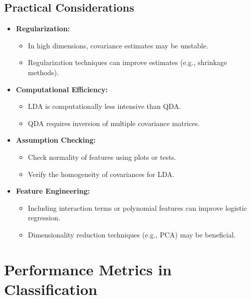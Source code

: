 \documentclass{article}
\begin{document}
\subsection{Practical Considerations}

\begin{itemize}
    \item \textbf{Regularization:}
    \begin{itemize}
        \item In high dimensions, covariance estimates may be unstable.
        \item Regularization techniques can improve estimates (e.g., shrinkage methods).
    \end{itemize}
    \item \textbf{Computational Efficiency:}
    \begin{itemize}
        \item LDA is computationally less intensive than QDA.
        \item QDA requires inversion of multiple covariance matrices.
    \end{itemize}
    \item \textbf{Assumption Checking:}
    \begin{itemize}
        \item Check normality of features using plots or tests.
        \item Verify the homogeneity of covariances for LDA.
    \end{itemize}
    \item \textbf{Feature Engineering:}
    \begin{itemize}
        \item Including interaction terms or polynomial features can improve logistic regression.
        \item Dimensionality reduction techniques (e.g., PCA) may be beneficial.
    \end{itemize}
\end{itemize}

\section{Performance Metrics in Classification}
\end{document}
